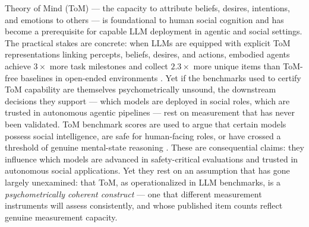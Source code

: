\documentclass{article} %
\begin{document}
Theory of Mind (ToM) --- the capacity to attribute beliefs, desires,
intentions, and emotions to others --- is foundational to human social
cognition \citep{beaudoin2020atoms} and has become a prerequisite for
capable LLM deployment in agentic and social settings.
The practical stakes are concrete: when LLMs are equipped with explicit
ToM representations linking percepts, beliefs, desires, and actions,
embodied agents achieve $3\times$ more task milestones and collect
$2.3\times$ more unique items than ToM-free baselines in open-ended
environments \citep{licua2026mindforge}.
Yet if the benchmarks used to certify ToM capability are themselves
psychometrically unsound, the downstream decisions they support ---
which models are deployed in social roles, which are trusted in
autonomous agentic pipelines --- rest on measurement that has never
been validated.
ToM benchmark scores are used to argue that certain models possess
social intelligence, are safe for human-facing roles, or have crossed a
threshold of genuine mental-state reasoning
\citep{kosinski2024evaluating, chen2024tombench}.
These are consequential claims: they influence which models are advanced
in safety-critical evaluations and trusted in autonomous social
applications. Yet they rest on an assumption that has gone largely
unexamined: that ToM, as operationalized in LLM benchmarks, is a
\textit{psychometrically coherent construct} --- one that different
measurement instruments will assess consistently, and whose published
item counts reflect genuine measurement capacity.
\end{document}
